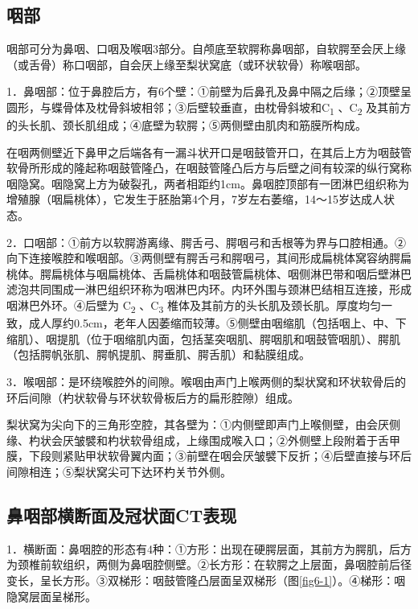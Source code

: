 \subsection{咽部}

咽部可分为鼻咽、口咽及喉咽3部分。自颅底至软腭称鼻咽部，自软腭至会厌上缘（或舌骨）称口咽部，自会厌上缘至梨状窝底（或环状软骨）称喉咽部。

1．鼻咽部：位于鼻腔后方，有6个壁：①前壁为后鼻孔及鼻中隔之后缘；②顶壁呈圆形，与蝶骨体及枕骨斜坡相邻；③后壁较垂直，由枕骨斜坡和C\textsubscript{1}
、C\textsubscript{2}
及其前方的头长肌、颈长肌组成；④底壁为软腭；⑤两侧壁由肌肉和筋膜所构成。

在咽两侧壁近下鼻甲之后端各有一漏斗状开口是咽鼓管开口，在其后上方为咽鼓管软骨所形成的隆起称咽鼓管隆凸，在咽鼓管隆凸后方与后壁之间有较深的纵行窝称咽隐窝。咽隐窝上方为破裂孔，两者相距约1cm。鼻咽腔顶部有一团淋巴组织称为增殖腺（咽扁桃体），它发生于胚胎第4个月，7岁左右萎缩，14～15岁达成人状态。

2．口咽部：①前方以软腭游离缘、腭舌弓、腭咽弓和舌根等为界与口腔相通。②向下连接喉腔和喉咽部。③两侧壁有腭舌弓和腭咽弓，其间形成扁桃体窝容纳腭扁桃体。腭扁桃体与咽扁桃体、舌扁桃体和咽鼓管扁桃体、咽侧淋巴带和咽后壁淋巴滤泡共同围成一淋巴组织环称为咽淋巴内环。内环外围与颈淋巴结相互连接，形成咽淋巴外环。④后壁为
C\textsubscript{2} 、C\textsubscript{3}
椎体及其前方的头长肌及颈长肌。厚度均匀一致，成人厚约0.5cm，老年人因萎缩而较薄。⑤侧壁由咽缩肌（包括咽上、中、下缩肌）、咽提肌（位于咽缩肌内面，包括茎突咽肌、腭咽肌和咽鼓管咽肌）、腭肌（包括腭帆张肌、腭帆提肌、腭垂肌、腭舌肌）和黏膜组成。

3．喉咽部：是环绕喉腔外的间隙。喉咽由声门上喉两侧的梨状窝和环状软骨后的环后间隙（杓状软骨与环状软骨板后方的扁形腔隙）组成。

梨状窝为尖向下的三角形空腔，其各壁为：①内侧壁即声门上喉侧壁，由会厌侧缘、杓状会厌皱襞和杓状软骨组成，上缘围成喉入口；②外侧壁上段附着于舌甲膜，下段则紧贴甲状软骨翼内面；③前壁在咽会厌皱襞下反折；④后壁直接与环后间隙相连；⑤梨状窝尖可下达环杓关节外侧。

\subsection{鼻咽部横断面及冠状面CT表现}

1．横断面：鼻咽腔的形态有4种：①方形：出现在硬腭层面，其前方为腭肌，后方为颈椎前软组织，两侧为鼻咽腔侧壁。②长方形：在软腭之上层面，鼻咽腔前后径变长，呈长方形。③双梯形：咽鼓管隆凸层面呈双梯形（图\ref{fig6-1}）。④梯形：咽隐窝层面呈梯形。

